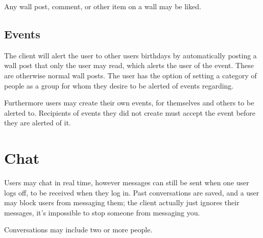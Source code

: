 Any wall post, comment, or other item on a wall may be liked.
    
\subsection{Events}
The client will alert the user to other users birthdays by automatically posting
a wall post that only the user may read, which alerts the user of the event.
These are otherwise normal wall posts. The user has the option of setting a
category of people as a group for whom they desire to be alerted of events
regarding.

Furthermore users may create their own events, for themselves and others to be
alerted to. Recipients of events they did not create must accept the event
before they are alerted of it.

\section{Chat}
Users may chat in real time, however messages can still be sent when one user
logs off, to be received when they log in. Past conversations are saved, and a
user may block users from messaging them; the client actually just ignores their
messages, it's impossible to stop someone from messaging you.

Conversations may include two or more people.
